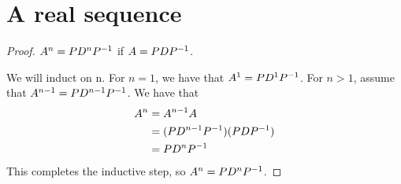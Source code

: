\section{A real sequence}

\begin{proof} $A^n = PD^nP^{-1}$ if $A = PDP^{-1}$.\gap

    We will induct on n.
    For $n=1$, we have that $A^1 = PD^1P^{-1}$.
    For $n>1$, assume that $A^{n-1} = PD^{n-1}P^{-1}$.
    We have that
    \begin{align}
        A^n
        &= A^{n-1} A \\
        &= (PD^{n-1}P^{-1}) (PDP^{-1}) \\
        &= PD^nP^{-1}
    \end{align}
    This completes the inductive step, 
    so $A^n = PD^nP^{-1}$.
\end{proof}

